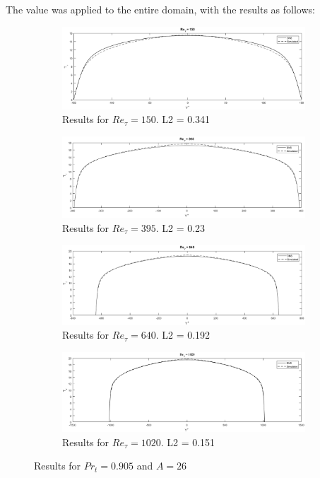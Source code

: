 \documentclass[10pt]{article} %
\begin{document}
The value was applied to the entire domain, with the results as follows:
\begin{figure}[!h]
	\centering
	\begin{subfigure}[t]{0.5\textwidth}
		\centering
		\includegraphics[angle=0, scale=0.24]{150segundo}
		\caption{Results for $Re_\tau = 150$. L2 = 0.341}
	\end{subfigure}
	\begin{subfigure}[t]{0.45\textwidth}
		\centering
		\includegraphics[angle=0, scale=0.24]{395segundo}
		\caption{Results for $Re_\tau = 395$. L2 = 0.23}
	\end{subfigure}
	\begin{subfigure}[t]{0.5\textwidth}
		\centering
		\includegraphics[angle=0, scale=0.24]{640segundo}
		\caption{Results for $Re_\tau = 640$. L2 = 0.192}
	\end{subfigure}
	\begin{subfigure}[t]{0.45\textwidth}
		\centering
		\includegraphics[angle=0, scale=0.24]{1020segundo}
		\caption{Results for $Re_\tau = 1020$. L2 = 0.151}
	\end{subfigure}	
	\caption{Results for $Pr_t = 0.905$ and $A = 26$}
\end{figure}
\end{document}
